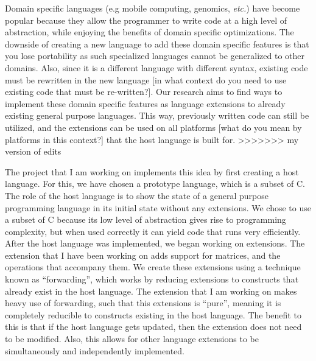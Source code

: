 \documentclass[a4paper,12pt]{article}
\begin{document}
Domain specific languages (e.g mobile computing, genomics, \emph{etc.}) have become popular because they allow the programmer to write code at a high level of abstraction, while enjoying the benefits of domain specific optimizations. The downside of creating a new language to add these domain specific features is that you lose portability as such specialized languages cannot be generalized to other domains. Also, since it is a different language with different syntax, existing code must be rewritten in the new language [in what context do you need to use existing code that must be re-written?]. Our research aims to find ways to implement these domain specific features as language extensions to already existing general purpose languages. This way, previously written code can still be utilized, and the extensions can be used on all platforms [what do you mean by platforms in this context?] that the host language is built for.  
>>>>>>> my version of edits

The project that I am working on implements this idea by first creating a host language. For this, we have chosen a prototype language, which is a subset of C. The role of the host language is to show the state of a general purpose programming language in its initial state without any extensions.  We chose to use a subset of C because its low level of abstraction gives rise to programming complexity, but when used correctly it can yield code that runs very efficiently. After the host language was implemented, we began working on extensions. The extension that I have been working on adds support for matrices, and the operations that accompany them. We create these extensions using a technique known as ``forwarding'', which works by reducing extensions to constructs that already exist in the host language.  The extension that I am working on makes heavy use of forwarding, such that this extensions is ``pure'', meaning it is completely reducible to constructs existing in the host language.  The benefit to this is that if the host language gets updated, then the extension does not need to be modified.  Also, this allows for other language extensions to be simultaneously and independently implemented.
\end{document}
